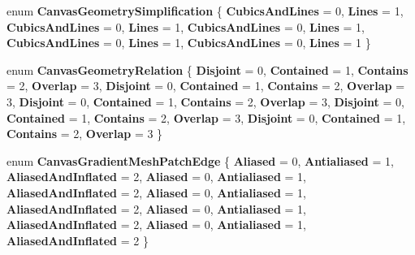 \begin{DoxyCompactItemize}
enum {\bfseries Canvas\+Geometry\+Simplification} \{ \newline
{\bfseries Cubics\+And\+Lines} = 0, 
{\bfseries Lines} = 1, 
{\bfseries Cubics\+And\+Lines} = 0, 
{\bfseries Lines} = 1, 
\newline
{\bfseries Cubics\+And\+Lines} = 0, 
{\bfseries Lines} = 1, 
{\bfseries Cubics\+And\+Lines} = 0, 
{\bfseries Lines} = 1, 
\newline
{\bfseries Cubics\+And\+Lines} = 0, 
{\bfseries Lines} = 1
 \}
\item 
\mbox{\label{namespace_microsoft_1_1_graphics_1_1_canvas_1_1_geometry_abb27c8fb8d2b8f00eb3225ac6f3531e3}} 
enum {\bfseries Canvas\+Geometry\+Relation} \{ \newline
{\bfseries Disjoint} = 0, 
{\bfseries Contained} = 1, 
{\bfseries Contains} = 2, 
{\bfseries Overlap} = 3, 
\newline
{\bfseries Disjoint} = 0, 
{\bfseries Contained} = 1, 
{\bfseries Contains} = 2, 
{\bfseries Overlap} = 3, 
\newline
{\bfseries Disjoint} = 0, 
{\bfseries Contained} = 1, 
{\bfseries Contains} = 2, 
{\bfseries Overlap} = 3, 
\newline
{\bfseries Disjoint} = 0, 
{\bfseries Contained} = 1, 
{\bfseries Contains} = 2, 
{\bfseries Overlap} = 3, 
\newline
{\bfseries Disjoint} = 0, 
{\bfseries Contained} = 1, 
{\bfseries Contains} = 2, 
{\bfseries Overlap} = 3
 \}
\item 
\mbox{\label{namespace_microsoft_1_1_graphics_1_1_canvas_1_1_geometry_ad355c607a325a3422031f9e574b3dd1b}} 
enum {\bfseries Canvas\+Gradient\+Mesh\+Patch\+Edge} \{ \newline
{\bfseries Aliased} = 0, 
{\bfseries Antialiased} = 1, 
{\bfseries Aliased\+And\+Inflated} = 2, 
{\bfseries Aliased} = 0, 
\newline
{\bfseries Antialiased} = 1, 
{\bfseries Aliased\+And\+Inflated} = 2, 
{\bfseries Aliased} = 0, 
{\bfseries Antialiased} = 1, 
\newline
{\bfseries Aliased\+And\+Inflated} = 2, 
{\bfseries Aliased} = 0, 
{\bfseries Antialiased} = 1, 
{\bfseries Aliased\+And\+Inflated} = 2, 
\newline
{\bfseries Aliased} = 0, 
{\bfseries Antialiased} = 1, 
{\bfseries Aliased\+And\+Inflated} = 2
 \}
\item 

\end{DoxyCompactItemize}
